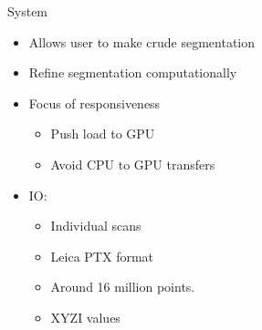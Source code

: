\documentclass{beamer}
\begin{document}
\begin{frame}{System}

\begin{itemize}
\item Allows user to make crude segmentation
\item Refine segmentation computationally
\item Focus of responsiveness
\begin{itemize}
\item Push load to GPU
\item Avoid CPU to GPU transfers
\end{itemize}
\item IO:
\begin{itemize}
\item Individual scans
\item Leica PTX format
\item Around 16 million points. %
\item XYZI values
\end{itemize}

\end{itemize}

\end{frame}
\end{document}
